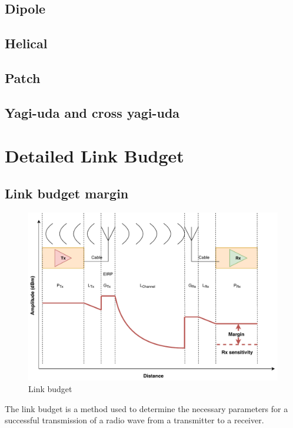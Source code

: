 \subsection{Dipole}
\subsection{Helical}
\subsection{Patch}
\subsection{Yagi-uda and cross yagi-uda}

\section{Detailed Link Budget}
\subsection{Link budget margin}
\begin{figure}[h]
\centering
\hspace*{-2cm}
\includegraphics[scale=1.1]{figures/link_budget.pdf}
\caption{Link budget}
\end{figure}

The link budget is a method used to determine the necessary parameters for a successful transmission of a radio wave from a transmitter to a receiver.  

